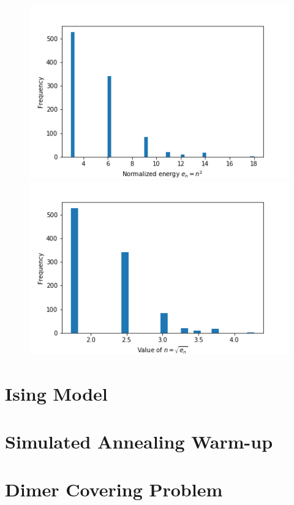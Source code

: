 \documentclass{article}
\begin{document}
\begin{figure}[H]
	\centering
	\begin{minipage}{0.49\linewidth}
		\includegraphics[width=\linewidth]{../images/q1a_energy_hist.png}
	\end{minipage}
		\begin{minipage}{0.49\linewidth}
		\includegraphics[width=\linewidth]{../images/q1a_n_hist.png}
	\end{minipage}

\end{figure}

\section{Ising Model}

\section{Simulated Annealing Warm-up}

\section{Dimer Covering Problem}
\end{document}
